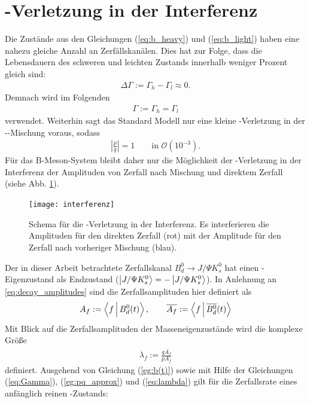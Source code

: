 \section{\CP-Verletzung in der Interferenz}
Die Zustände aus den Gleichungen (\ref{eq:b_heavy}) und (\ref{eq:b_light}) haben eine nahezu gleiche Anzahl an Zerfällskanälen. Dies hat zur Folge, dass die Lebensdauern des schweren und leichten Zustands innerhalb weniger Prozent gleich sind:
\begin{align}
\Delta \Gamma := \Gamma_h - \Gamma_l \approx 0.
\end{align}
Demnach wird im Folgenden 
\begin{align}
\Gamma := \Gamma_h = \Gamma_l \label{eq:Gamma}
\end{align}
verwendet. Weiterhin sagt das Standard Modell nur eine kleine \CP-Verletzung in der \Bd-\Bdbar-Mischung voraus, sodass
\begin{align}
\left|\frac{p}{q}\right| = 1 \qquad \text{in } \mathcal{O}(10^{-3}). \label{eg:pq_approx}
\end{align}
Für das B-Meson-System bleibt daher nur die Möglichkeit der \CP-Verletzung in der Interferenz der Amplituden von Zerfall nach Mischung und direktem Zerfall (siehe Abb. \ref{fig:interferenz}). 
\begin{figure}[hptb]
\centering
\texttt{[image: interferenz]}
\caption{Schema für die \CP-Verletzung in der Interferenz. Es interferieren die Amplituden für den direkten Zerfall (rot) mit der Amplitude für den Zerfall nach vorheriger Mischung (blau).}
\label{fig:interferenz}
\end{figure}
Der in dieser Arbeit betrachtete Zerfallskanal $B_d^0 \rightarrow J/\Psi K_s^0$ hat einen \CP-Eigenzustand als Endzustand (\CP $\Ket{J/\Psi K_s^0} = -\Ket{J/\Psi K_s^0}$). In Anlehnung an \ref{eq:decay_amplitudes} sind die Zerfallsamplituden hier definiert als
\begin{align}
\nonumber A_f := \Braket{f|\text{\Bd}(t)\vphantom{\text{\Bdbar}}}, \qquad \overline{A_{f}} := \Braket{f|\text{\Bdbar}(t)}
\end{align}
Mit Blick auf die Zerfallsamplituden der Masseneigenzustände wird die komplexe Größe
\begin{align}
\lambda_f := \frac{q\overline{A_f}}{pA_f} \label{eq:lambda}
\end{align}
definiert. Ausgehend von Gleichung (\ref{eg:b(t)}) sowie mit Hilfe der Gleichungen (\ref{eq:Gamma}), (\ref{eg:pq_approx}) und (\ref{eq:lambda}) gilt für die Zerfallsrate eines anfänglich reinen \Bd-Zustands:
